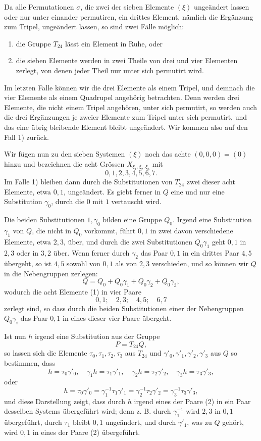 \documentclass[11pt]{article}
\begin{document}
Da alle Permutationen $\sigma$, die zwei der sieben Elemente $(\xi)$ ungeändert lassen oder nur unter einander permutiren, ein drittes Element, nämlich die Ergänzung zum Tripel, ungeändert lassen, so sind zwei Fälle möglich:
\begin{enumerate}[label=\arabic*),leftmargin=2.8em]
\item die Gruppe $T_{24}$ lässt ein Element in Ruhe, oder
\item die sieben Elemente werden in zwei Theile von drei und vier Elementen zerlegt, von denen jeder Theil nur unter sich permutirt wird.
\end{enumerate}
Im letzten Falle können wir die drei Elemente als einem Tripel, und demnach die vier Elemente als einem Quadrupel angehörig betrachten. Denn werden drei Elemente, die nicht einem Tripel angehören, unter sich permutirt, so werden auch die drei Ergänzungen je zweier Elemente zum Tripel unter sich permutirt, und das eine übrig bleibende Element bleibt ungeändert. Wir kommen also auf den Fall 1) zurück.

Wir fügen nun zu den sieben Systemen $(\xi)$ noch das achte $(0,0,0)=(0)$ hinzu und bezeichnen die acht Grössen $X_{\xi_1,\xi_2,\xi_3}$ mit
\begin{equation}
 0,1,2,3,4,5,6,7.
 \tag{1}
\end{equation}
Im Falle 1) bleiben dann durch die Substitutionen von $T_{24}$ zwei dieser acht Elemente, etwa $0,1$, ungeändert. Es giebt ferner in $Q$ eine und nur eine Substitution $\gamma_0$, durch die $0$ mit $1$ vertauscht wird.

Die beiden Substitutionen $1,\gamma_0$ bilden eine Gruppe $Q_0$. Irgend eine Substitution $\gamma_1$ von $Q$, die nicht in $Q_0$ vorkommt, führt $0,1$ in zwei davon verschiedene Elemente, etwa $2,3$, über, und durch die zwei Substitutionen $Q_0\gamma_1$ geht $0,1$ in $2,3$ oder in $3,2$ über. Wenn ferner durch $\gamma_2$ das Paar $0,1$ in ein drittes Paar $4,5$ übergeht, so ist $4,5$ sowohl von $0,1$ als von $2,3$ verschieden, und so können wir $Q$ in die Nebengruppen zerlegen:
\[
 Q=Q_0+Q_0\gamma_1+Q_0\gamma_2+Q_0\gamma_3,
\]
wodurch die acht Elemente (1) in vier Paare
\begin{equation}
 0,1;\quad 2,3;\quad 4,5;\quad 6,7
 \tag{2}
\end{equation}
zerlegt sind, so dass durch die beiden Substitutionen einer der Nebengruppen $Q_0\gamma_i$ das Paar $0,1$ in eines dieser vier Paare übergeht.

Ist nun $h$ irgend eine Substitution aus der Gruppe
\[
 P=T_{24}Q,
\]
so lassen sich die Elemente $\tau_0,\tau_1,\tau_2,\tau_3$ aus $T_{24}$ und $\gamma'_0,\gamma'_1,\gamma'_2,\gamma'_3$ aus $Q$ so bestimmen, dass
\[
 h=\tau_0\gamma'_0,
 \quad \gamma_1h=\tau_1\gamma'_1,
 \quad \gamma_2h=\tau_2\gamma'_2,
 \quad \gamma_3h=\tau_3\gamma'_3,
\]
oder
\[
 h=\tau_0\gamma'_0
 =\gamma_1^{-1}\tau_1\gamma'_1
 =\gamma_2^{-1}\tau_2\gamma'_2
 =\gamma_3^{-1}\tau_3\gamma'_3,
\]
und diese Darstellung zeigt, dass durch $h$ irgend eines der Paare (2) in ein Paar desselben Systems übergeführt wird; denn z. B. durch $\gamma_1^{-1}$ wird $2,3$ in $0,1$ übergeführt, durch $\tau_1$ bleibt $0,1$ ungeändert, und durch $\gamma'_1$, was zu $Q$ gehört, wird $0,1$ in eines der Paare (2) übergeführt.
\end{document}
